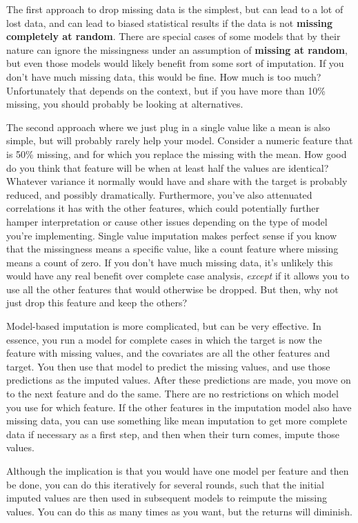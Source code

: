 \documentclass[
  letterpaper,
]{krantz}
\begin{document}
The first approach to drop missing data is the simplest, but can lead to
a lot of lost data, and can lead to biased statistical results if the
data is not \textbf{missing completely at random}. There are special
cases of some models that by their nature can ignore the missingness
under an assumption of \textbf{missing at random}, but even those models
would likely benefit from some sort of imputation. If you don't have
much missing data, this would be fine. How much is too much?
Unfortunately that depends on the context, but if you have more than
10\% missing, you should probably be looking at alternatives.

The second approach where we just plug in a single value like a mean is
also simple, but will probably rarely help your model. Consider a
numeric feature that is 50\% missing, and for which you replace the
missing with the mean. How good do you think that feature will be when
at least half the values are identical? Whatever variance it normally
would have and share with the target is probably reduced, and possibly
dramatically. Furthermore, you've also attenuated correlations it has
with the other features, which could potentially further hamper
interpretation or cause other issues depending on the type of model
you're implementing. Single value imputation makes perfect sense if you
know that the missingness means a specific value, like a count feature
where missing means a count of zero. If you don't have much missing
data, it's unlikely this would have any real benefit over complete case
analysis, \emph{except} if it allows you to use all the other features
that would otherwise be dropped. But then, why not just drop this
feature and keep the others?

Model-based imputation is more complicated, but can be very effective.
In essence, you run a model for complete cases in which the target is
now the feature with missing values, and the covariates are all the
other features and target. You then use that model to predict the
missing values, and use those predictions as the imputed values. After
these predictions are made, you move on to the next feature and do the
same. There are no restrictions on which model you use for which
feature. If the other features in the imputation model also have missing
data, you can use something like mean imputation to get more complete
data if necessary as a first step, and then when their turn comes,
impute those values.

Although the implication is that you would have one model per feature
and then be done, you can do this iteratively for several rounds, such
that the initial imputed values are then used in subsequent models to
reimpute the missing values. You can do this as many times as you want,
but the returns will diminish.
\end{document}
